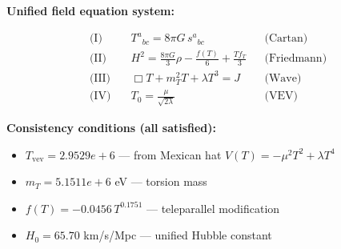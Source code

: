 
\textbf{Unified field equation system:}

\begin{align}
  \text{(I)} \quad & T^a{}_{bc} = 8\pi G \, s^a{}_{bc} && \text{(Cartan)} \\
  \text{(II)} \quad & H^2 = \frac{8\pi G}{3}\rho - \frac{f(T)}{6} + \frac{Tf_T}{3} && \text{(Friedmann)} \\
  \text{(III)} \quad & \Box T + m_T^2 T + \lambda T^3 = J && \text{(Wave)} \\
  \text{(IV)} \quad & T_0 = \frac{\mu}{\sqrt{2\lambda}} && \text{(VEV)}
\end{align}

\textbf{Consistency conditions (all satisfied):}
\begin{itemize}
  \item $T_{\text{vev}} = 2.9529e+6$ — from Mexican hat $V(T) = -\mu^2 T^2 + \lambda T^4$
  \item $m_T = 5.1511e+6$ eV — torsion mass
  \item $f(T) = -0.0456 \, T^{0.1751}$ — teleparallel modification
  \item $H_0 = 65.70$ km/s/Mpc — unified Hubble constant
\end{itemize}